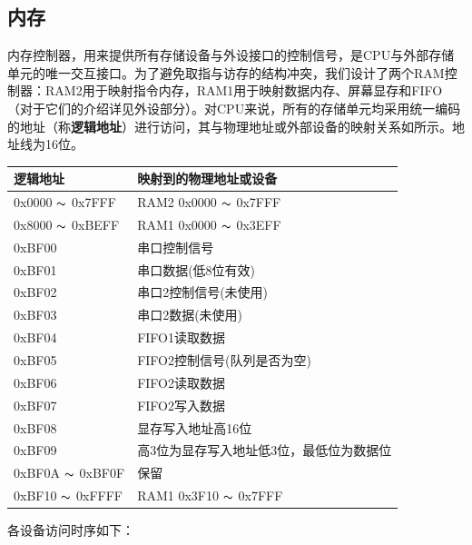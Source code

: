 \subsection{内存}

内存控制器，用来提供所有存储设备与外设接口的控制信号，是CPU与外部存储单元的唯一交互接口。为了避免取指与访存的结构冲突，我们设计了两个RAM控制器：RAM2用于映射指令内存，RAM1用于映射数据内存、屏幕显存和FIFO（对于它们的介绍详见外设部分）。对CPU来说，所有的存储单元均采用统一编码的地址（称\textbf{逻辑地址}）进行访问，其与物理地址或外部设备的映射关系如所示。地址线为16位。

\begin{center}
    \label{table:mem_addr}
    \begin{longtable}{ll}
        \toprule
        逻辑地址 & 映射到的物理地址或设备 \\
        \midrule
        0x0000 $\thicksim$ 0x7FFF & RAM2 0x0000 $\thicksim$ 0x7FFF \\
        0x8000 $\thicksim$ 0xBEFF & RAM1 0x0000 $\thicksim$ 0x3EFF \\
        0xBF00 & 串口控制信号 \\
        0xBF01 & 串口数据(低8位有效) \\
        0xBF02 & 串口2控制信号(未使用) \\
        0xBF03 & 串口2数据(未使用) \\
        0xBF04 & FIFO1读取数据 \\
        0xBF05 & FIFO2控制信号(队列是否为空) \\
        0xBF06 & FIFO2读取数据 \\
        0xBF07 & FIFO2写入数据 \\
        0xBF08 & 显存写入地址高16位 \\
        0xBF09 & 高3位为显存写入地址低3位，最低位为数据位 \\
        0xBF0A $\thicksim$ 0xBF0F & 保留 \\
        0xBF10 $\thicksim$ 0xFFFF & RAM1 0x3F10 $\thicksim$ 0x7FFF \\
        \bottomrule
    \end{longtable}
\end{center}

各设备访问时序如下：


